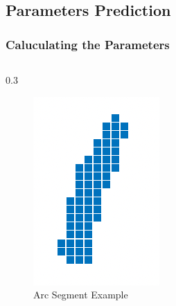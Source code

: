 \documentclass[aspectratio=169]{beamer}
\begin{document}
    \subsection{Parameters Prediction}
    \begin{frame}
        \frametitle{Caluculating the Parameters}
    
        \begin{columns}
            \begin{column}
                {0.3\linewidth}
                \begin{figure}
                    \includegraphics[width=\linewidth]{pic/arc.png}
                    \caption{Arc Segment Example}
                \end{figure}
            \end{column}
            

\end{columns}
\end{frame}
\end{document}
